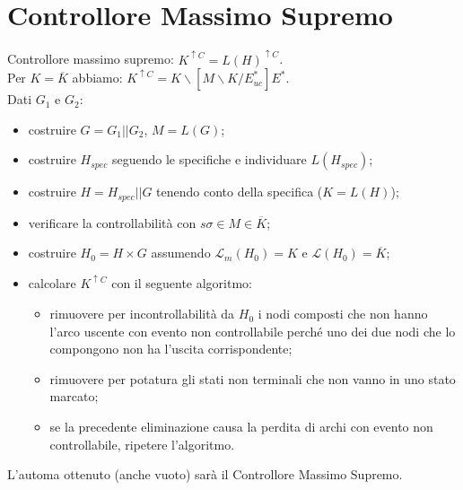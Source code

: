 \documentclass[a4paper, notitlepage, 10pt]{report}
\begin{document}
\section*{Controllore Massimo Supremo}
Controllore massimo supremo: $K^{\uparrow C} = L(H)^{\uparrow C}$.
\\
Per $K=\overline{K}$ abbiamo: $K^{\uparrow C} = K\backslash [M\backslash K / E^*_{uc}] E^*$.
\\
Dati $G_1$ e $G_2$:
\begin{itemize}
	\item costruire $G = G_1 || G_2$, $M = L(G)$;
	\item costruire $H_{spec}$ seguendo le specifiche e individuare $L(H_{spec})$;
	\item costruire $H = H_{spec} || G$ tenendo conto della specifica ($K = L(H)$);
	\item verificare la controllabilità con $s\sigma \in M \in \overline{K}$;
	\item costruire $H_0 = H \times G$ assumendo $\mathcal{L}_m(H_0) = K$ e $\mathcal{L}(H_0) = \overline{K}$;
	\item calcolare $K^{\uparrow C}$ con il seguente algoritmo:
	\begin{itemize}
		\item rimuovere per incontrollabilità da $H_0$ i nodi composti che non hanno l'arco uscente con evento non controllabile perché uno dei due nodi che lo compongono non ha l'uscita corrispondente;
		\item rimuovere per potatura gli stati non terminali che non vanno in uno stato marcato;
		\item se la precedente eliminazione causa la perdita di archi con evento non controllabile, ripetere l'algoritmo.
	\end{itemize}
\end{itemize} 
\noindent
L'automa ottenuto (anche vuoto) sarà il Controllore Massimo Supremo.
\end{document}
